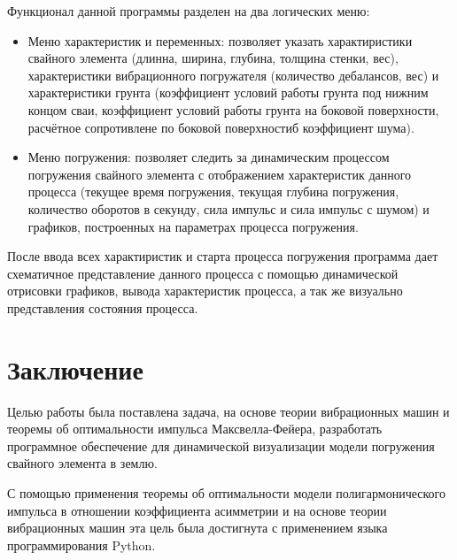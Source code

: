 Функционал данной программы разделен на два логических меню:
\begin{itemize}
    \item Меню характеристик и переменных:
    позволяет указать характиристики свайного элемента (длинна, ширина, глубина, толщина стенки, вес),
    характеристики вибрационного погружателя (количество дебалансов, вес) и характеристики грунта
    (коэффициент условий работы грунта под нижним концом сваи, коэффициент условий работы грунта на боковой поверхности,
    расчётное сопротивлене по боковой поверхностиб коэффициент шума).
    \item Меню погружения:
    позволяет следить за динамическим процессом погружения свайного элемента с отображением характеристик данного процесса
    (текущее время погружения, текущая глубина погружения, количество оборотов в секунду, сила импульс и сила импульс с шумом)
    и графиков, построенных на параметрах процесса погружения.
\end{itemize}

После ввода всех характиристик и старта процесса погружения программа дает схематичное представление данного процесса с помощью динамической отрисовки графиков,
вывода характеристик процесса, а так же визуально представления состояния процесса.

\clearpage
\section{Заключение}

Целью работы была поставлена задача, на основе теории вибрационных машин и теоремы об оптимальности импульса Максвелла-Фейера,
разработать программное обеспечение для динамической визуализации модели погружения свайного элемента в землю.

С помощью применения теоремы об оптимальности модели полигармонического импульса в отношении коэффициента асимметрии и на основе теории вибрационных машин
эта цель была достигнута с применением языка программирования Python.


\clearpage
{}
\nocite{*}
\printbibliography{}
